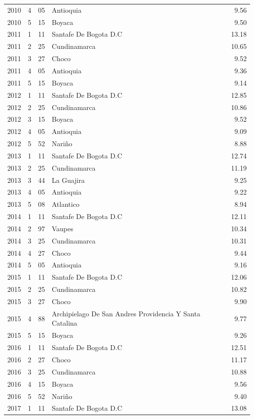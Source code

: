 \begin{tabular}{rrllr}
2010 & 4 & 05 & Antioquia & 9.56 \\
2010 & 5 & 15 & Boyaca & 9.50 \\
2011 & 1 & 11 & Santafe De Bogota D.C & 13.18 \\
2011 & 2 & 25 & Cundinamarca & 10.65 \\
2011 & 3 & 27 & Choco & 9.52 \\
2011 & 4 & 05 & Antioquia & 9.36 \\
2011 & 5 & 15 & Boyaca & 9.14 \\
2012 & 1 & 11 & Santafe De Bogota D.C & 12.85 \\
2012 & 2 & 25 & Cundinamarca & 10.86 \\
2012 & 3 & 15 & Boyaca & 9.52 \\
2012 & 4 & 05 & Antioquia & 9.09 \\
2012 & 5 & 52 & Nariño & 8.88 \\
2013 & 1 & 11 & Santafe De Bogota D.C & 12.74 \\
2013 & 2 & 25 & Cundinamarca & 11.19 \\
2013 & 3 & 44 & La Guajira & 9.25 \\
2013 & 4 & 05 & Antioquia & 9.22 \\
2013 & 5 & 08 & Atlantico & 8.94 \\
2014 & 1 & 11 & Santafe De Bogota D.C & 12.11 \\
2014 & 2 & 97 & Vaupes & 10.34 \\
2014 & 3 & 25 & Cundinamarca & 10.31 \\
2014 & 4 & 27 & Choco & 9.44 \\
2014 & 5 & 05 & Antioquia & 9.16 \\
2015 & 1 & 11 & Santafe De Bogota D.C & 12.06 \\
2015 & 2 & 25 & Cundinamarca & 10.82 \\
2015 & 3 & 27 & Choco & 9.90 \\
2015 & 4 & 88 & Archipielago De San Andres Providencia Y Santa Catalina & 9.77 \\
2015 & 5 & 15 & Boyaca & 9.26 \\
2016 & 1 & 11 & Santafe De Bogota D.C & 12.51 \\
2016 & 2 & 27 & Choco & 11.17 \\
2016 & 3 & 25 & Cundinamarca & 10.88 \\
2016 & 4 & 15 & Boyaca & 9.56 \\
2016 & 5 & 52 & Nariño & 9.40 \\
2017 & 1 & 11 & Santafe De Bogota D.C & 13.08 \\

\end{tabular}
